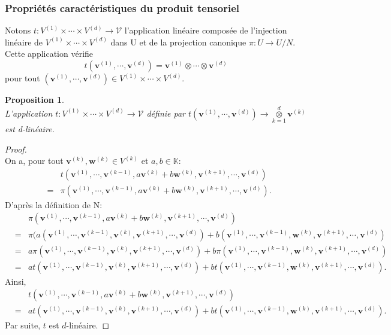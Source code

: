\documentclass[11pt,a4paper,oneside]{book}
\newtheorem{prop}{Proposition}[chapter]
\newtheorem{proof}{Démonstration}
\def\K{\mathbb K}
\def\V{\mathcal V}
\def\ktensor{\overset{d}{\underset{k=1}{\otimes}}}
\def\v{\mathbf v}
\def\w{\mathbf w}
\begin{document}
\subsubsection{Propriétés caractéristiques du produit tensoriel}
Notons $ t: V^{(1)}\times \cdots\times V^{(d)}\rightarrow \V $ l'application linéaire composée de l'injection linéaire de $ V^{(1)}\times \cdots\times V^{(d)} $ dans U et de la projection canonique $ \pi:U\longrightarrow U/N $. Cette application vérifie
$$t(\v^{(1)},\cdots,\v^{(d)})=\v^{(1)}\otimes\cdots \otimes\v^{(d)} $$ pour tout $ (\v^{(1)},\cdots,\v^{(d)})\in V^{(1)}\times \cdots\times V^{(d)} $. 
\begin{prop}\label{prop:1.9}
\emph{\\}
L'application $t: V^{(1)}\times \cdots\times V^{(d)}\longrightarrow \V $ définie par $ t(\v^{(1)},\cdots,\v^{(d)})\longrightarrow \ktensor \v^{(k)}$ est d-linéaire.
\end{prop}
\begin{proof}
\emph{\\}
On a, pour tout $ \v^{(k)},\w^{(k)} \in V^{(k)}$ et $ a,b\in \K $:
\begin{eqnarray}
&&t(\v^{(1)},\cdots,\v^{(k-1)},a\v^{(k)}+b\w^{(k)},\v^{(k+1)},\cdots,\v^{(d)})\nonumber\\
&=&\pi(\v^{(1)},\cdots,\v^{(k-1)},a\v^{(k)}+b\w^{(k)},
\v^{(k+1)},\cdots,\v^{(d)}).\nonumber
\end{eqnarray} D'après la définition de N:
\begin{eqnarray}
&&\pi(\v^{(1)},\cdots,\v^{(k-1)},a\v^{(k)}+b\w^{(k)},\v^{(k+1)},\cdots,\v^{(d)})\nonumber\\ &=&\pi(a(\v^{(1)},\cdots,\v^{(k-1)},\v^{(k)},\v^{(k+1)},\cdots,\v^{(d)})+b(\v^{(1)},\cdots,\v^{(k-1)},\w^{(k)},\v^{(k+1)},\cdots,\v^{(d)})\nonumber\\
&=&a\pi(\v^{(1)},\cdots,\v^{(k-1)},\v^{(k)},\v^{(k+1)},\cdots,\v^{(d)})+b\pi(\v^{(1)},\cdots,\v^{(k-1)},\w^{(k)},\v^{(k+1)},\cdots,\v^{(d)})\nonumber\\
&=&at(\v^{(1)},\cdots,\v^{(k-1)},\v^{(k)},\v^{(k+1)},\cdots,\v^{(d)})+bt(\v^{(1)},\cdots,\v^{(k-1)},\w^{(k)},\v^{(k+1)},\cdots,\v^{(d)}).\nonumber
\end{eqnarray} Ainsi,
\begin{eqnarray}
&&t(\v^{(1)},\cdots,\v^{(k-1)},a\v^{(k)}+b\w^{(k)},\v^{(k+1)},\cdots,\v^{(d)})\nonumber\\
&=&at(\v^{(1)},\cdots,\v^{(k-1)},\v^{(k)},\v^{(k+1)},\cdots,\v^{(d)})+ bt(\v^{(1)},\cdots,\v^{(k-1)},\w^{(k)},\v^{(k+1)},\cdots,\v^{(d)}).\nonumber
\end{eqnarray} Par suite, $ t $ est $ d $-linéaire.
\end{proof}
\end{document}
